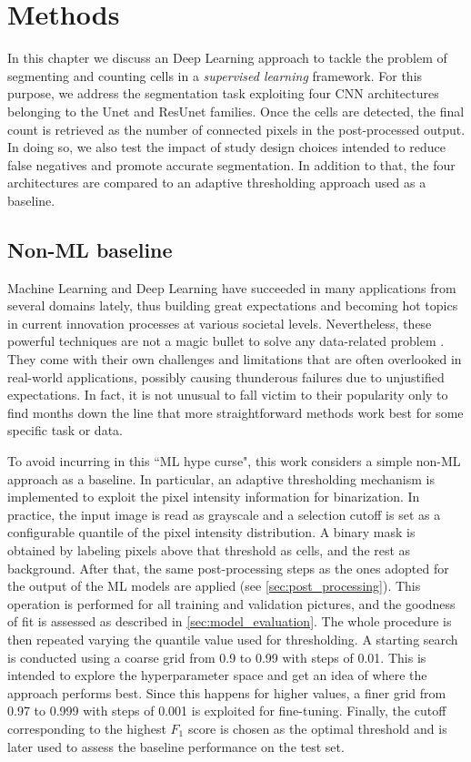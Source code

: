 \chapter{Methods}
\label{chap:partI_methods}

In this chapter we discuss an Deep Learning approach to tackle the problem of segmenting and counting cells in a \textit{supervised learning} framework. 
For this purpose, we address the segmentation task exploiting four CNN architectures belonging to the Unet and ResUnet families. 
Once the cells are detected, the final count is retrieved as the number of connected pixels in the post-processed output.
In doing so, we also test the impact of study design choices intended to reduce false negatives and promote accurate segmentation.
In addition to that, the four architectures are compared to an adaptive thresholding approach used as a baseline. 

\section{Non-ML baseline}
\label{baseline}

Machine Learning and Deep Learning have succeeded in many applications from several domains lately, thus building great expectations and becoming hot topics in current innovation processes at various societal levels.
Nevertheless, these powerful techniques are not a magic bullet to solve any data-related problem \cite{wolpert1997nofreelunch}. They come with their own challenges and limitations that are often overlooked in real-world applications, possibly causing thunderous failures due to unjustified expectations.
In fact, it is not unusual to fall victim to their popularity only to find months down the line that more straightforward methods work best for some specific task or data.

To avoid incurring in this ``ML hype curse", this work considers a simple non-ML approach as a baseline. 
In particular, an adaptive thresholding mechanism is implemented to exploit the pixel intensity information for binarization.
In practice, the input image is read as grayscale and a selection cutoff is set as a configurable quantile of the pixel intensity distribution.
A binary mask is obtained by labeling pixels above that threshold as cells, and the rest as background.
After that, the same post-processing steps as the ones adopted for the output of the ML models are applied (see \cref{sec:post_processing}).
This operation is performed for all training and validation pictures, and the goodness of fit is assessed as described in \cref{sec:model_evaluation}.
The whole procedure is then repeated varying the quantile value used for thresholding. A starting search is conducted using a coarse grid from 0.9 to 0.99 with steps of 0.01. This is intended to explore the hyperparameter space and get an idea of where the approach performs best. 
Since this happens for higher values, a finer grid from 0.97 to 0.999 with steps of 0.001 is exploited for fine-tuning.
Finally, the cutoff corresponding to the highest $F_1$ score is chosen as the optimal threshold and is later used to assess the baseline performance on the test set.

